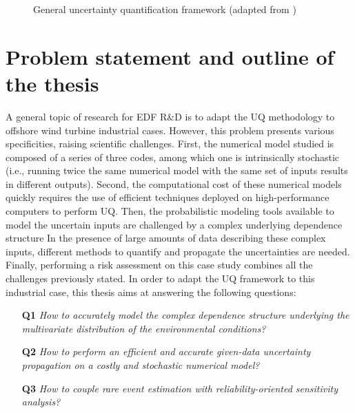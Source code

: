 \begin{figure}[!h]
    \centering
    
    \caption{General uncertainty quantification framework (adapted from \cite{ajenjo_2023})}
    \label{fig:UQ_methodo}
\end{figure}


\section*{Problem statement and outline of the thesis}
A general topic of research for EDF R\&D is to adapt the UQ methodology to offshore wind turbine industrial cases.  
However, this problem presents various specificities, raising scientific challenges. 
First, the numerical model studied is composed of a series of three codes, among which one is intrinsically stochastic 
(i.e., running twice the same numerical model with the same set of inputs results in different outputs). 
Second, the computational cost of these numerical models quickly requires the use of efficient techniques deployed on high-performance computers to perform UQ.
Then, the probabilistic modeling tools available to model the uncertain inputs are challenged by a complex underlying dependence structure
In the presence of large amounts of data describing these complex inputs, different methods to quantify and propagate the uncertainties are needed.  
Finally, performing a risk assessment on this case study combines all the challenges previously stated. 
In order to adapt the UQ framework to this industrial case, this thesis aims at answering the following questions:
\begin{itemize}
    \item[\textbf{Q1}] \textit{How to accurately model the complex dependence structure underlying the multivariate distribution of the environmental conditions?} 
    \item[\textbf{Q2}] \textit{How to perform an efficient and accurate given-data uncertainty propagation on a costly and stochastic numerical model?}
    \item[\textbf{Q3}] \textit{How to couple rare event estimation with reliability-oriented sensitivity analysis?}
\end{itemize}


